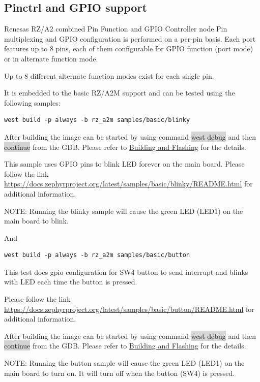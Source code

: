 \documentclass[11pt,a4paper,oneside]{article}
\begin{document}
\subsection{Pinctrl and GPIO support}\label{pinctrl-and-gpio-support}

Renesas RZ/A2 combined Pin Function and GPIO Controller node Pin
multiplexing and GPIO configuration is performed on a per-pin basis.
Each port features up to 8 pins, each of them configurable for GPIO
function (port mode) or in alternate function mode.

Up to 8 different alternate function modes exist for each single pin.

It is embedded to the basic RZ/A2M support and can be tested using the
following samples:

\begin{lstlisting}
west build -p always -b rz_a2m samples/basic/blinky
\end{lstlisting}

After building the image can be started by using command \colorbox{lightgray}{west debug}
and then \colorbox{lightgray}{continue} from the GDB. Please refer to
\hyperref[building-and-flashing]{Building and Flashing} for the
details.

This sample uses GPIO pins to blink LED forever on the main board.
Please follow the link
\url{https://docs.zephyrproject.org/latest/samples/basic/blinky/README.html}
for additional information.

NOTE: Running the \textquotesingle blinky\textquotesingle{} sample will
cause the green LED (LED1) on the main board to blink.

And

\begin{lstlisting}
west build -p always -b rz_a2m samples/basic/button
\end{lstlisting}

This test does gpio configuration for SW4 button to send interrupt and
blinks with LED each time the button is pressed.

Please follow the link
\url{https://docs.zephyrproject.org/latest/samples/basic/button/README.html}
for additional information.

After building the image can be started by using command \colorbox{lightgray}{west debug}
and then \colorbox{lightgray}{continue} from the GDB. Please refer to
\hyperref[building-and-flashing]{Building and Flashing} for the
details.

NOTE: Running the \textquotesingle button\textquotesingle{} sample will
cause the green LED (LED1) on the main board to turn on. It will turn
off when the button (SW4) is pressed.
\end{document}
